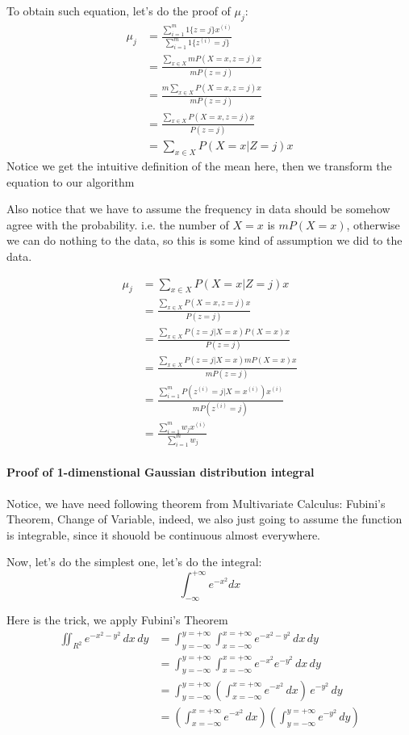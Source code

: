 \documentclass[12pt]{article}
\begin{document}
To obtain such equation, let's do the proof of $\mu_j$:
\begin{align}
  \mu_j &= \frac{\sum_{i=1}^m1\{z=j\}x^{(i)}}{\sum_{i=1}^m1\{z^{(i)}=j\}}\\
        &= \frac{\sum_{x\in X}mP(X=x, z=j)x}{mP(z=j)}\\
        &= \frac{m\sum_{x\in X}P(X=x, z=j)x}{mP(z=j)}\\
        &= \frac{\sum_{x\in X}P(X=x, z=j)x}{P(z=j)}\\
        &= \sum_{x\in X}P(X=x|Z=j)x
\end{align}
Notice we get the intuitive definition of the mean here, then we transform the equation to our algorithm

Also notice that we have to assume the frequency in data should be somehow agree with the probability. i.e. the number of $X=x$ is $mP(X=x)$, otherwise we can do nothing to the data, so this is some kind of assumption we did to the data.

\begin{align}
  \mu_j &= \sum_{x\in X}P(X=x|Z=j)x\\
        &= \frac{\sum_{x\in X}P(X=x, z=j)x}{P(z=j)}\\
        &= \frac{\sum_{x\in X}P(z=j|X=x)P(X=x)x}{P(z=j)}\\
        &= \frac{\sum_{x\in X}P(z=j|X=x)mP(X=x)x}{mP(z=j)}\\
        &= \frac{\sum_{i=1}^mP(z^{(i)}=j|X=x^{(i)})x^{(i)}}{mP(z^{(i)}=j)}\\
        &= \frac{\sum_{i=1}^mw_jx^{(i)}}{\sum_{i=1}^mw_j}
\end{align}

\paragraph{Proof of 1-dimenstional Gaussian distribution integral}
Notice, we have need following theorem from Multivariate Calculus: Fubini's Theorem, Change of Variable, indeed, we also just going to assume the function is integrable, since it shouold be continuous almost everywhere.

Now, let's do the simplest one, let's do the integral:
\[
  \int_{-\infty}^{+\infty}e^{-x^2}dx
\]

Here is the trick, we apply Fubini's Theorem
\begin{align}
  \iint_{R^2}e^{-x^2-y^2} \,dx \,dy &= \int_{y=-\infty}^{y=+\infty}\int_{x=-\infty}^{x=+\infty}e^{-x^2-y^2} \,dx \,dy\\
                           &= \int_{y=-\infty}^{y=+\infty}\int_{x=-\infty}^{x=+\infty}e^{-x^2}e^{-y^2} \,dx \,dy\\
                           &= \int_{y=-\infty}^{y=+\infty}(\int_{x=-\infty}^{x=+\infty}e^{-x^2} \,dx)\, e^{-y^2} \,dy\\
                           &=(\int_{x=-\infty}^{x=+\infty}e^{-x^2} \,dx) (\int_{y=-\infty}^{y=+\infty} e^{-y^2} \,dy)
\end{align}
\end{document}
